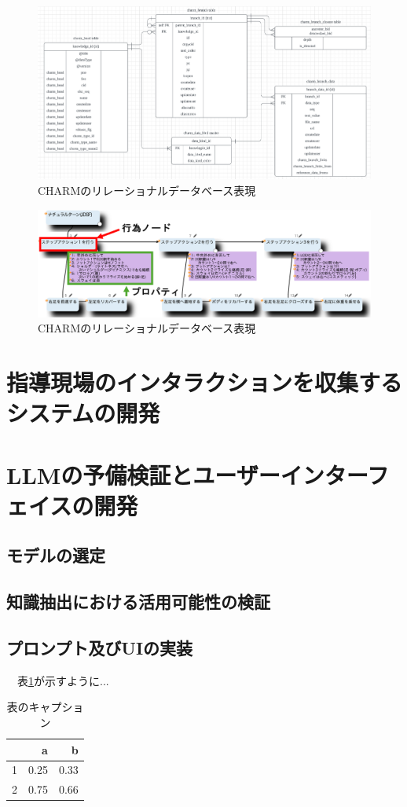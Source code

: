 \begin{figure}[htbp]
    \centering
    \includegraphics[width=1.0\linewidth]{./image/charm_database.png}
    \caption{CHARMのリレーショナルデータベース表現}
    \label{fig2}
\end{figure}

\begin{figure}[htbp]
    \centering
    \includegraphics[width=1.0\linewidth]{./image/charm_natural_turn.png}
    \caption{CHARMのリレーショナルデータベース表現}
    \label{fig3}
\end{figure}

\section{指導現場のインタラクションを収集するシステムの開発}


\section{LLMの予備検証とユーザーインターフェイスの開発}
\subsection{モデルの選定}
\subsection{知識抽出における活用可能性の検証}
\subsection{プロンプト及びUIの実装}


　表\ref{table1}が示すように...\\

\begin{table}[h]
    \centering
    \begin{tabular}{r|rr}
    & a & b\\ \hline
    1& 0.25 & 0.33\\
    2& 0.75 & 0.66\\
    \end{tabular}
    \caption{表のキャプション}
    \label{table1}
\end{table}
